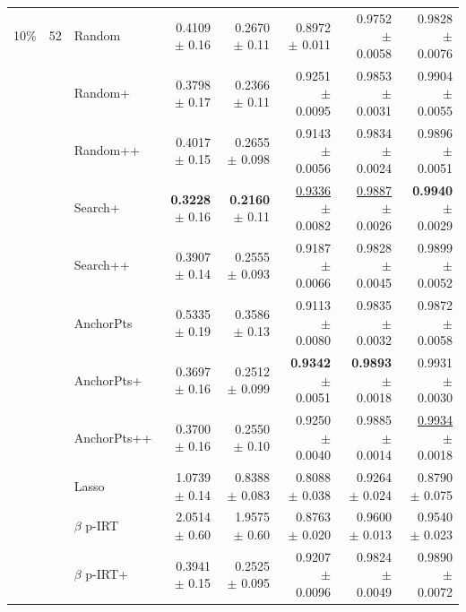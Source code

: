 \begin{longtable}{llp{}rrrrr}
\midrule
10\% & 52 & Random & 0.4109 {\scriptsize $\pm$ 0.16} & 0.2670 {\scriptsize $\pm$ 0.11} & 0.8972 {\scriptsize $\pm$ 0.011} & 0.9752 {\scriptsize $\pm$ 0.0058} & 0.9828 {\scriptsize $\pm$ 0.0076} \\
 &  & Random+ & 0.3798 {\scriptsize $\pm$ 0.17} & 0.2366 {\scriptsize $\pm$ 0.11} & 0.9251 {\scriptsize $\pm$ 0.0095} & 0.9853 {\scriptsize $\pm$ 0.0031} & 0.9904 {\scriptsize $\pm$ 0.0055} \\
 &  & Random++ & 0.4017 {\scriptsize $\pm$ 0.15} & 0.2655 {\scriptsize $\pm$ 0.098} & 0.9143 {\scriptsize $\pm$ 0.0056} & 0.9834 {\scriptsize $\pm$ 0.0024} & 0.9896 {\scriptsize $\pm$ 0.0051} \\
 &  & Search+ & \textbf{0.3228} {\scriptsize $\pm$ 0.16} & \textbf{0.2160} {\scriptsize $\pm$ 0.11} & \underline{0.9336} {\scriptsize $\pm$ 0.0082} & \underline{0.9887} {\scriptsize $\pm$ 0.0026} & \textbf{0.9940} {\scriptsize $\pm$ 0.0029} \\
 &  & Search++ & 0.3907 {\scriptsize $\pm$ 0.14} & 0.2555 {\scriptsize $\pm$ 0.093} & 0.9187 {\scriptsize $\pm$ 0.0066} & 0.9828 {\scriptsize $\pm$ 0.0045} & 0.9899 {\scriptsize $\pm$ 0.0052} \\
 &  & AnchorPts & 0.5335 {\scriptsize $\pm$ 0.19} & 0.3586 {\scriptsize $\pm$ 0.13} & 0.9113 {\scriptsize $\pm$ 0.0080} & 0.9835 {\scriptsize $\pm$ 0.0032} & 0.9872 {\scriptsize $\pm$ 0.0058} \\
 &  & AnchorPts+ & 0.3697 {\scriptsize $\pm$ 0.16} & 0.2512 {\scriptsize $\pm$ 0.099} & \textbf{0.9342} {\scriptsize $\pm$ 0.0051} & \textbf{0.9893} {\scriptsize $\pm$ 0.0018} & 0.9931 {\scriptsize $\pm$ 0.0030} \\
 &  & AnchorPts++ & 0.3700 {\scriptsize $\pm$ 0.16} & 0.2550 {\scriptsize $\pm$ 0.10} & 0.9250 {\scriptsize $\pm$ 0.0040} & 0.9885 {\scriptsize $\pm$ 0.0014} & \underline{0.9934} {\scriptsize $\pm$ 0.0018} \\
 &  & Lasso & 1.0739 {\scriptsize $\pm$ 0.14} & 0.8388 {\scriptsize $\pm$ 0.083} & 0.8088 {\scriptsize $\pm$ 0.038} & 0.9264 {\scriptsize $\pm$ 0.024} & 0.8790 {\scriptsize $\pm$ 0.075} \\
 &  & $\beta$ p-IRT & 2.0514 {\scriptsize $\pm$ 0.60} & 1.9575 {\scriptsize $\pm$ 0.60} & 0.8763 {\scriptsize $\pm$ 0.020} & 0.9600 {\scriptsize $\pm$ 0.013} & 0.9540 {\scriptsize $\pm$ 0.023} \\
 &  & $\beta$ p-IRT+ & 0.3941 {\scriptsize $\pm$ 0.15} & 0.2525 {\scriptsize $\pm$ 0.095} & 0.9207 {\scriptsize $\pm$ 0.0096} & 0.9824 {\scriptsize $\pm$ 0.0049} & 0.9890 {\scriptsize $\pm$ 0.0072} \\

\end{longtable}
